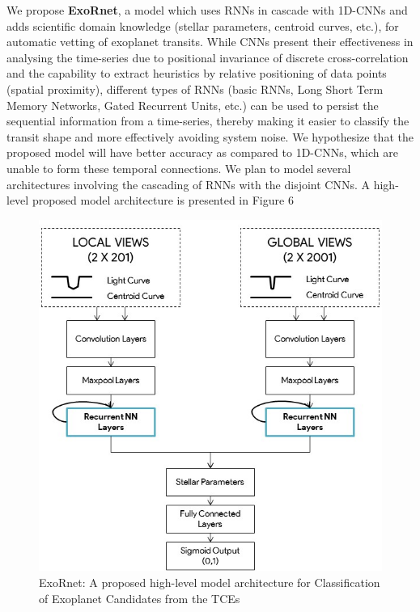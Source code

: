
We propose \textbf{ExoRnet}, a model which uses RNNs in cascade with 1D-CNNs and adds scientific domain knowledge (stellar parameters, centroid curves, etc.), for automatic vetting of exoplanet transits. While CNNs present their effectiveness in analysing the time-series due to positional invariance of discrete cross-correlation and the capability to extract heuristics by relative positioning of data points (spatial proximity), different types of RNNs (basic RNNs, Long Short Term Memory Networks, Gated Recurrent Units, etc.) can be used to persist the sequential information from a time-series, thereby making it easier to classify the transit shape and more effectively avoiding system noise. We hypothesize that the proposed model will have better accuracy as compared to 1D-CNNs, which are unable to form these temporal connections. We plan to model several architectures involving the cascading of RNNs with the disjoint CNNs. A high-level proposed model architecture is presented in Figure 6\\

\begin{figure}[H]
    \centering
    \includegraphics[scale=0.5]{Images/RNN_Model.jpg}
    \caption{ExoRnet: A proposed high-level model architecture for Classification of Exoplanet Candidates from the TCEs}
    \label{fig:Ansdell}
\end{figure}

